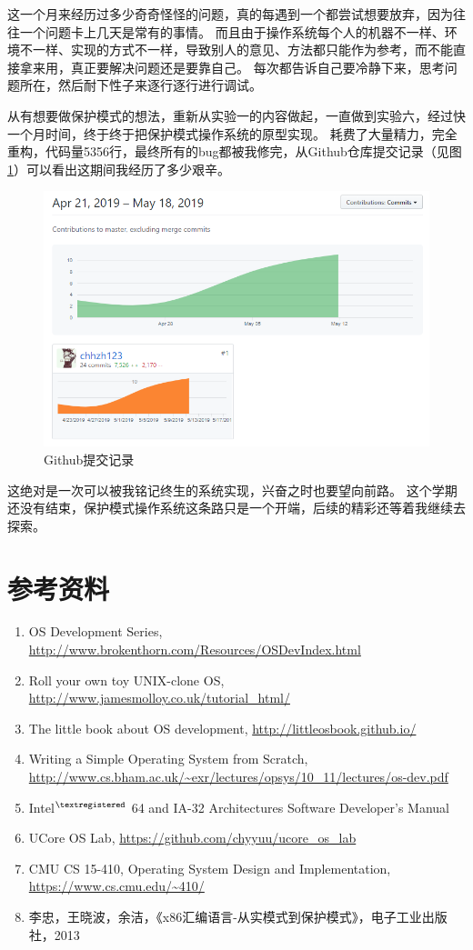 \documentclass[logo,reportComp]{thesis}
\begin{document}
这一个月来经历过多少奇奇怪怪的问题，真的每遇到一个都尝试想要放弃，因为往往一个问题卡上几天是常有的事情。
而且由于操作系统每个人的机器不一样、环境不一样、实现的方式不一样，导致别人的意见、方法都只能作为参考，而不能直接拿来用，真正要解决问题还是要靠自己。
每次都告诉自己要冷静下来，思考问题所在，然后耐下性子来逐行逐行进行调试。

从有想要做保护模式的想法，重新从实验一的内容做起，一直做到实验六，经过快一个月时间，终于终于把保护模式操作系统的原型实现。
耗费了大量精力，完全重构，代码量5356行，最终所有的bug都被我修完，从Github仓库提交记录（见图\ref{fig:github}）可以看出这期间我经历了多少艰辛。
\begin{figure}[H]
\centering
\includegraphics[width=0.8\linewidth]{fig/github.PNG}
\caption{Github提交记录}
\label{fig:github}
\end{figure}

这绝对是一次可以被我铭记终生的系统实现，兴奋之时也要望向前路。
这个学期还没有结束，保护模式操作系统这条路只是一个开端，后续的精彩还等着我继续去探索。


\section{参考资料}
\begin{enumerate}
	\item OS Development Series, \url{http://www.brokenthorn.com/Resources/OSDevIndex.html}
	\item Roll your own toy UNIX-clone OS, \url{http://www.jamesmolloy.co.uk/tutorial_html/}
	\item The little book about OS development, \url{http://littleosbook.github.io/}
	\item Writing a Simple Operating System from Scratch, \url{http://www.cs.bham.ac.uk/~exr/lectures/opsys/10_11/lectures/os-dev.pdf}
	\item Intel$^{\textregistered}$ 64 and IA-32 Architectures Software Developer's Manual
	\item UCore OS Lab, \url{https://github.com/chyyuu/ucore_os_lab}
	\item CMU CS 15-410, Operating System Design and Implementation, \url{https://www.cs.cmu.edu/~410/}
	\item 李忠，王晓波，余洁，《x86汇编语言-从实模式到保护模式》，电子工业出版社，2013
\end{enumerate}
\end{document}
